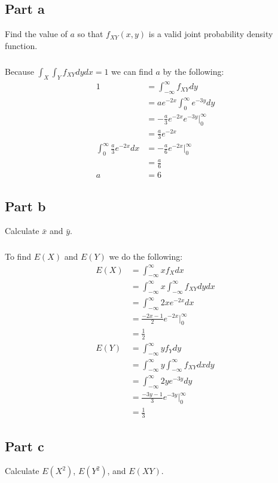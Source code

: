 \documentclass[11pt]{article}
\begin{document}
\subsection*{Part a}
Find the value of $a$ so that $f_{XY}(x,y)$ is a valid joint probability density function.

\subparagraph*{}
Because $\int_X \int_Y f_{XY}dydx=1$ we can find $a$ by the following:
\begin{align*}
	1 &= \int_{-\infty}^\infty f_{XY} dy \\
	&= ae^{-2x}\int_0^\infty e^{-3y}dy \\
	&= -\frac{a}{3}e^{-2x}e^{-3y}\Big|_0^\infty \\
	&= \frac{a}{3}e^{-2x} \\
	\int_0^\infty \frac{a}{3}e^{-2x}dx &= -\frac{a}{6}e^{-2x}\Big|_0^\infty \\
	&= \frac{a}{6} \\
	a &= 6
\end{align*}

\subsection*{Part b}
Calculate $\bar{x}$ and $\bar{y}$.

\subparagraph*{}
To find $E(X)$ and $E(Y)$ we do the following:
\begin{align*}
	E(X) &= \int_{-\infty}^{\infty}xf_Xdx \\
	&= \int_{-\infty}^{\infty}x\int_{-\infty}^{\infty}f_{XY}dydx \\
	&= \int_{-\infty}^{\infty}2xe^{-2x}dx \\
	&= \frac{-2x-1}{2}e^{-2x}\Big|_0^\infty \\
	&= \frac{1}{2} \\
	E(Y) &= \int_{-\infty}^{\infty}yf_Ydy \\
	&= \int_{-\infty}^{\infty}y\int_{-\infty}^{\infty}f_{XY}dxdy \\
	&= \int_{-\infty}^{\infty}2ye^{-3y}dy \\
	&= \frac{-3y-1}{3}e^{-3y}\Big|_0^\infty \\
	&= \frac{1}{3}
\end{align*}

\subsection*{Part c}
Calculate $E(X^2)$, $E(Y^2)$, and $E(XY)$.
\end{document}
